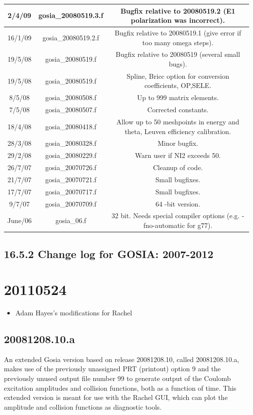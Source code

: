 \documentclass[10pt]{article}
\begin{document}
\begin{center}
\begin{tabular}{|c|c|c|}
\hline
2/4/09 & gosia\_20080519.3.f & Bugfix relative to 20080519.2 (E1 polarization was incorrect). \\
\hline
16/1/09 & gosia\_20080519.2.f & Bugfix relative to 20080519.1 (give error if too many omega steps). \\
\hline
19/5/08 & gosia\_20080519.f & Bugfix relative to 20080519 (several small bugs). \\
\hline
19/5/08 & gosia\_20080519.f & Spline, Bricc option for conversion coefficients, OP,SELE. \\
\hline
8/5/08 & gosia\_20080508.f & Up to 999 matrix elements. \\
\hline
7/5/08 & gosia\_20080507.f & Corrected constants. \\
\hline
18/4/08 & gosia\_20080418.f & Allow up to 50 meshpoints in energy and theta, Leuven efficiency calibration. \\
\hline
28/3/08 & gosia\_20080328.f & Minor bugfix. \\
\hline
29/2/08 & gosia\_20080229.f & Warn user if NI2 exceeds 50. \\
\hline
26/7/07 & gosia\_20070726.f & Cleanup of code. \\
\hline
21/7/07 & gosia\_20070721.f & Small bugfixes. \\
\hline
17/7/07 & gosia\_20070717.f & Small bugfixes. \\
\hline
9/7/07 & gosia\_20070709.f & 64 -bit version. \\
\hline
June/06 & gosia\_06.f & 32 bit. Needs special compiler options (e.g. -fno-automatic for g77). \\
\hline
\end{tabular}
\end{center}

\subsection*{16.5.2 Change log for GOSIA: 2007-2012}
\section*{20110524}
\begin{itemize}
  \item Adam Hayes's modifications for Rachel
\end{itemize}

\subsection*{20081208.10.a}
An extended Gosia version based on release 20081208.10, called 20081208.10.a, makes use of the previously unassigned PRT (printout) option 9 and the previously unused output file number 99 to generate output of the Coulomb excitation amplitudes and collision functions, both as a function of time. This extended version is meant for use with the Rachel GUI, which can plot the amplitude and collision functions as diagnostic tools.
\end{document}
